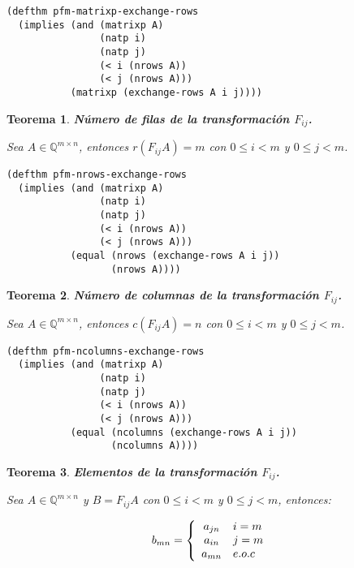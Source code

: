 \documentclass[a4paper,10pt]{article}
\newcommand{\M}[3]{#1 \in \mathbb{Q}^{#2 \times #3}}
\newtheorem{teor}{{Teorema}}
\begin{document}
\begin{lstlisting}[language=clips]
(defthm pfm-matrixp-exchange-rows
  (implies (and (matrixp A)
                (natp i)
                (natp j)
                (< i (nrows A))
                (< j (nrows A)))
           (matrixp (exchange-rows A i j))))
\end{lstlisting}

\par \vspace{16pt}

\begin{teor} \textbf{Número de filas de la transformación $F_{ij}$.}\vspace{8pt}\par
Sea $\M{A}{m}{n}$, entonces $r(F_{ij}A) = m$ con $0 \leq i < m$ y $0 \leq j < m$.
\end{teor}

\begin{lstlisting}[language=clips]
(defthm pfm-nrows-exchange-rows
  (implies (and (matrixp A)
                (natp i)
                (natp j)
                (< i (nrows A))
                (< j (nrows A)))
           (equal (nrows (exchange-rows A i j)) 
                  (nrows A))))
\end{lstlisting}

\par \vspace{16pt}

\begin{teor} \textbf{Número de columnas de la transformación $F_{ij}$.}\vspace{8pt}\par
Sea $\M{A}{m}{n}$, entonces $c(F_{ij}A) = n$ con $0 \leq i < m$ y $0 \leq j < m$.
\end{teor}

\begin{lstlisting}[language=clips]
(defthm pfm-ncolumns-exchange-rows
  (implies (and (matrixp A)
                (natp i)
                (natp j)
                (< i (nrows A))
                (< j (nrows A)))
           (equal (ncolumns (exchange-rows A i j)) 
                  (ncolumns A))))
\end{lstlisting}

\par \vspace{16pt}

\begin{teor} \textbf{Elementos de la transformación $F_{ij}$.}\vspace{8pt}\par
Sea $\M{A}{m}{n}$ y $B = F_{ij}A$ con $0 \leq i < m$ y $0 \leq j < m$, entonces:

\begin{equation*} 
b_{mn} = \left\{\begin{array}{c l} a_{jn} & i = m\\ 
                                   a_{in} & j = m\\
																	 a_{mn} & e.o.c\end{array}\right.
\end{equation*}

\end{teor}
\end{document}
